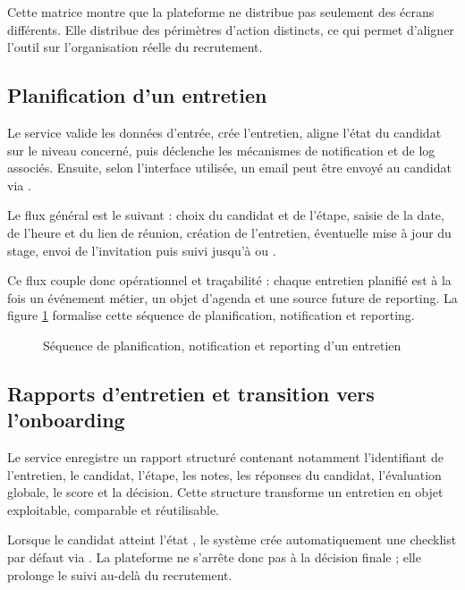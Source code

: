 Cette matrice montre que la plateforme ne distribue pas seulement des écrans différents. Elle distribue des périmètres d'action distincts, ce qui permet d'aligner l'outil sur l'organisation réelle du recrutement.


\subsection{Planification d'un entretien}
Le service  valide les données d'entrée, crée l'entretien, aligne l'état du candidat sur le niveau concerné, puis déclenche les mécanismes de notification et de log associés. Ensuite, selon l'interface utilisée, un email peut être envoyé au candidat via .

Le flux général est le suivant : choix du candidat et de l'étape, saisie de la date, de l'heure et du lien de réunion, création de l'entretien, éventuelle mise à jour du stage, envoi de l'invitation puis suivi jusqu'à  ou .

Ce flux couple donc opérationnel et traçabilité : chaque entretien planifié est à la fois un événement métier, un objet d'agenda et une source future de reporting.
La figure \ref{fig:interview-sequence} formalise cette séquence de planification, notification et reporting.

\begin{figure}[H]
  \centering
  \caption{\label{fig:interview-sequence}Séquence de planification, notification et reporting d'un entretien}
\end{figure}

\subsection{Rapports d'entretien et transition vers l'onboarding}
Le service  enregistre un rapport structuré contenant notamment l'identifiant de l'entretien, le candidat, l'étape, les notes, les réponses du candidat, l'évaluation globale, le score et la décision. Cette structure transforme un entretien en objet exploitable, comparable et réutilisable.

Lorsque le candidat atteint l'état , le système crée automatiquement une checklist par défaut via . La plateforme ne s'arrête donc pas à la décision finale ; elle prolonge le suivi au-delà du recrutement.

